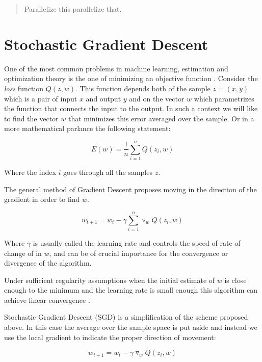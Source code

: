 \documentclass[11pt,a4paper]{article}
\begin{document}
\begin{abstract}
Parallelize this parallelize that.

\end{abstract}

\section{Stochastic Gradient Descent}


One of the most common problems in machine learning, estimation and optimization theory is the one of minimizing an objective function \citep{bottou2010large}. Consider the \textit{loss} function $Q(z, w)$. This function depends both of the sample $z=(x, y)$ which is a pair of input $x$ and output $y$ and on the vector $w$ which parametrizes the function that connects the input to the output. In such a context we will like to find the vector $w$ that minimizes this error averaged over the sample. Or in a more mathematical parlance the following statement:

\begin{equation}
E(w) = \frac{1}{n} \sum_{i=1}^n Q(z_i, w)
\end{equation}

Where the index $i$ goes through all the samples $z$. 

The general method of Gradient Descent proposes moving in the direction of the gradient in order to find $w$. 

\begin{equation}
w_{t + 1} = w_t - \gamma \sum_{i=1}^n \triangledown_w Q(z_i, w)
\end{equation}

Where $\gamma$ is usually called the learning rate and controls the speed of rate of change of in $w$, and can be of crucial
importance for the convergence or divergence of the algorithm. 

Under sufficient regularity assumptions when the initial estimate of $w$ is close enough to the minimum and the learning rate is small enough this algorithm can achieve linear convergence \citep{dennis1996numerical}. 

Stochastic Gradient Descent (SGD) is a simplification of the scheme proposed above. In this case the average over the sample space is put aside and instead we use the local gradient to indicate the proper direction of movement:

\begin{equation}
w_{t + 1} = w_t - \gamma  \triangledown_w Q(z_i, w)
\end{equation} 
\end{document}
